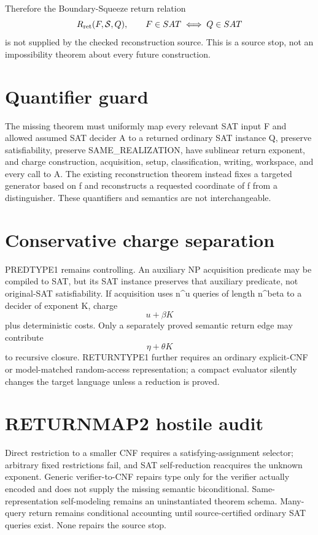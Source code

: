 \documentclass[11pt]{article}
\begin{document}
Therefore the Boundary-Squeeze return relation
\[
R_{\rm ret}(F,\mathcal S,Q),\qquad F\in SAT\iff Q\in SAT
\]
is not supplied by the checked reconstruction source. This is a source stop, not an impossibility theorem about every future construction.

\section*{Quantifier guard}
The missing theorem must uniformly map every relevant SAT input F and allowed assumed SAT decider A to a returned ordinary SAT instance Q, preserve satisfiability, preserve SAME_REALIZATION, have sublinear return exponent, and charge construction, acquisition, setup, classification, writing, workspace, and every call to A. The existing reconstruction theorem instead fixes a targeted generator based on f and reconstructs a requested coordinate of f from a distinguisher. These quantifiers and semantics are not interchangeable.

\section*{Conservative charge separation}
PREDTYPE1 remains controlling. An auxiliary NP acquisition predicate may be compiled to SAT, but its SAT instance preserves that auxiliary predicate, not original-SAT satisfiability. If acquisition uses n^u queries of length n^beta to a decider of exponent K, charge
\[
u+\beta K
\]
plus deterministic costs. Only a separately proved semantic return edge may contribute
\[
\eta+\theta K
\]
to recursive closure. RETURNTYPE1 further requires an ordinary explicit-CNF or model-matched random-access representation; a compact evaluator silently changes the target language unless a reduction is proved.

\section*{RETURNMAP2 hostile audit}
Direct restriction to a smaller CNF requires a satisfying-assignment selector; arbitrary fixed restrictions fail, and SAT self-reduction reacquires the unknown exponent. Generic verifier-to-CNF repairs type only for the verifier actually encoded and does not supply the missing semantic biconditional. Same-representation self-modeling remains an uninstantiated theorem schema. Many-query return remains conditional accounting until source-certified ordinary SAT queries exist. None repairs the source stop.
\end{document}
